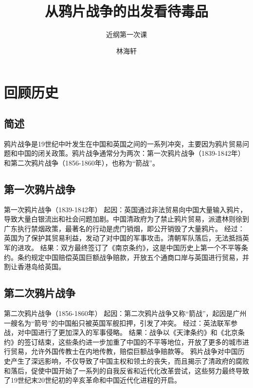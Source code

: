 \documentclass[10pt,a4paper]{beamer} %
\begin{document}
	
	\title{从鸦片战争的出发看待毒品}
	\subtitle{近纲第一次课}
	\author{林海轩}
	\date{}
	
	\begin{frame}
		\titlepage
	\end{frame}
	
	\begin{frame}
		\tableofcontents
	\end{frame}
	
	
	\section{回顾历史}
	\begin{frame}
		\subsection{简述}
		鸦片战争是19世纪中叶发生在中国和英国之间的一系列冲突，主要因为鸦片贸易问题和中国的闭关政策。鸦片战争通常分为两次：第一次鸦片战争（1839-1842年）和第二次鸦片战争（1856-1860年），也称为“箭战”。
	\end{frame}
		
	\begin{frame}
		\subsection{第一次鸦片战争}
		第一次鸦片战争（1839-1842年）
		起因：英国通过非法贸易向中国大量输入鸦片，导致大量白银流出和社会问题加剧。中国清政府为了禁止鸦片贸易，派遣林则徐到广东执行禁烟政策，最著名的行动是虎门销烟，即公开销毁了大量鸦片。
		经过：英国为了保护其贸易利益，发动了对中国的军事攻击。清朝军队落后，无法抵挡英军的进攻。
		结果：双方最终签订了《南京条约》，这是中国历史上第一个不平等条约。条约规定中国赔偿英国巨额战争赔款，开放五个通商口岸与英国进行贸易，并割让香港岛给英国。
	\end{frame}

	\begin{frame}
		\subsection{第二次鸦片战争}
			第二次鸦片战争（1856-1860年）
		起因：第二次鸦片战争又称“箭战”，起因是广州一艘名为“箭号”的中国船只被英国军舰扣押，引发了冲突。
		经过：英法联军参战，对中国进行了更加深入的军事侵略。
		结果：战争以《天津条约》和《北京条约》的签订结束，这些条约进一步加重了中国的不平等地位，开放了更多的城市进行贸易，允许外国传教士在内地传教，赔偿巨额战争赔款等。
		鸦片战争对中国历史产生了深远影响，不仅导致了中国主权和领土的丧失，而且揭示了清政府的腐败和落后，促使中国开始了一系列的自我反省和近代化改革尝试，这些努力最终导致了19世纪末20世纪初的辛亥革命和中国近代化进程的开启。\cite{111}\cite{222}
	\end{frame}
	
\end{document}
